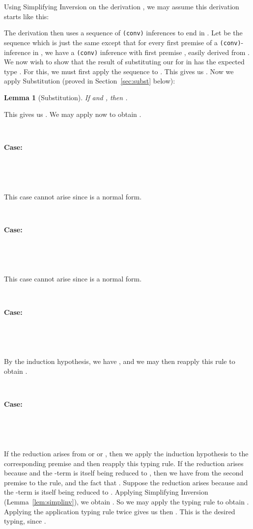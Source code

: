 \documentclass[copyright]{eptcs}
\newtheorem{lemma}{Lemma}
\begin{document}
\noindent Using Simplifying Inversion on the derivation , we may assume this derivation starts
like this:

\noindent The derivation then uses a sequence  of \texttt{(conv)}
inferences to end in .  Let
 be the sequence which is just the same except that for every
first premise  of a \texttt{(conv)}-inference
in , we have a \texttt{(conv)} inference with first premise
, easily derived from .  We now wish to show that the result of substituting our  for
 in  has the expected type .  For this, we must
first apply the sequence  to .  This
gives us .  Now we apply Substitution (proved
in Section~\ref{sec:subst} below):

\begin{lemma}[Substitution]
\label{lem:subst}
If  and ,
then .
\end{lemma}

\noindent This gives us .  We may
apply  now to obtain . 

\ 

\noindent \textbf{Case:}

\



\

\noindent This case cannot arise since  is a normal form.

\ 

\noindent \textbf{Case:}

\



\ 

\noindent This case cannot arise since  is a normal form.

\ 

\noindent \textbf{Case:}

\



\ 

\noindent By the induction hypothesis, we have ,
and we may then reapply this rule to obtain .

\ 

\noindent \textbf{Case:}

\



\ 

\noindent If the reduction arises from  or 
or , then we apply the induction hypothesis to the
corresponding premise and then reapply this typing rule.  If the
reduction arises because  and the -term is itself
being reduced to , then we have  from
the second premise to the rule, and the fact that . Suppose the reduction arises because  and the
-term is itself being reduced to
.  Applying Simplifying Inversion
(Lemma~\ref{lem:simplinv}), we obtain .  
So we may apply the  typing rule
to obtain .  Applying the
application typing rule twice gives us then
. This is the
desired typing, since .
\end{document}
